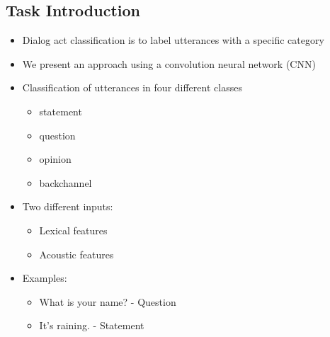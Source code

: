 \documentclass[a0,landscape]{a0poster}
\begin{document}
\begin{multicols}{3} %

\color{Black} %

\section*{Task Introduction}


\begin{itemize}
	\item Dialog act classification is to label utterances with a specific category
	\item We present an approach using a convolution neural network (CNN)
	\item Classification of utterances in four different classes
	\begin{itemize}
		\item statement
		\item question
		\item opinion
		\item backchannel
	\end{itemize}
	\item Two different inputs:
	\begin{itemize}
		\item Lexical features
		\item Acoustic features
	\end{itemize}
	
	
	\item Examples:
	\begin{itemize}
		\item What is your name? - Question
		\item It's raining. - Statement
	\end{itemize}
\end{itemize}


\end{multicols}
\end{document}
